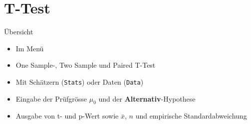 \documentclass{beamer}
\newlength{\tikey}
\newcommand{\keystroke}[1]{\settowidth{\tikey}{\scriptsize #1}\psframebox[framearc=0.2]{\parbox{\tikey}{\scriptsize #1}}}
\begin{document}
%
%

\section{T-Test}
\begin{frame}{Übersicht}
\begin{itemize}
\item Im Menü \keystroke{F6}
\item One Sample-, Two Sample und Paired T-Test
\item Mit Schätzern (\texttt{Stats}) oder Daten (\texttt{Data})
\item Eingabe der Prüfgrösse $\mu_0$ und der \textbf{Alternativ}-Hypothese
\item Ausgabe von t- und p-Wert sowie $\bar{x}$, $n$ und empirische Standardabweichung
\end{itemize}
\end{frame}
\end{document}
